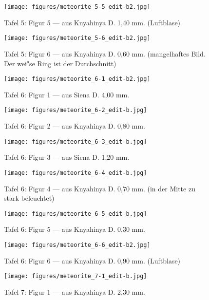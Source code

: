 \documentclass[a4paper, 11pt, oneside]{article}
\begin{document}
\clearpage
\begin{figure}[t]
\texttt{[image: figures/meteorite\_5-5\_edit-b2.jpg]}
\caption{Tafel 5: Figur 5 --- aus Knyahinya D. 1,40 mm. (Luftblase)}
\centering
\end{figure}
\clearpage
\begin{figure}[t]
\texttt{[image: figures/meteorite\_5-6\_edit-b2.jpg]}
\caption{Tafel 5: Figur 6 --- aus Knyahinya D. 0,60 mm. (mangelhaftes Bild. Der wei"se Ring ist der Durchschnitt)}
\centering
\end{figure}
\clearpage
{}
\begin{figure}[t]
\texttt{[image: figures/meteorite\_6-1\_edit-b2.jpg]}
\caption{Tafel 6: Figur 1 --- aus Siena D. 4,00 mm.}
\centering
\end{figure}
\clearpage
\begin{figure}[t]
\texttt{[image: figures/meteorite\_6-2\_edit-b.jpg]}
\caption{Tafel 6: Figur 2 --- aus Knyahinya D. 0,80 mm.}
\centering
\end{figure}
\clearpage
\begin{figure}[t]
\texttt{[image: figures/meteorite\_6-3\_edit-b.jpg]}
\caption{Tafel 6: Figur 3 --- aus Siena D. 1,20 mm.}
\centering
\end{figure}
\clearpage
\begin{figure}[t]
\texttt{[image: figures/meteorite\_6-4\_edit-b.jpg]}
\caption{Tafel 6: Figur 4 --- aus Knyahinya D. 0,70 mm. (in der Mitte zu stark beleuchtet)}
\centering
\end{figure}
\clearpage
\begin{figure}[t]
\texttt{[image: figures/meteorite\_6-5\_edit-b.jpg]}
\caption{Tafel 6: Figur 5 --- aus Knyahinya D. 0,30 mm.}
\centering
\end{figure}
\clearpage
\begin{figure}[t]
\texttt{[image: figures/meteorite\_6-6\_edit-b2.jpg]}
\caption{Tafel 6: Figur 6 --- aus Knyahinya D. 0,90 mm. (Luftblase)}
\centering
\end{figure}
\clearpage
{}
\begin{figure}[t]
\texttt{[image: figures/meteorite\_7-1\_edit-b.jpg]}
\caption{Tafel 7: Figur 1 --- aus Knyahinya D. 2,30 mm.}
\centering
\end{figure}
\end{document}
